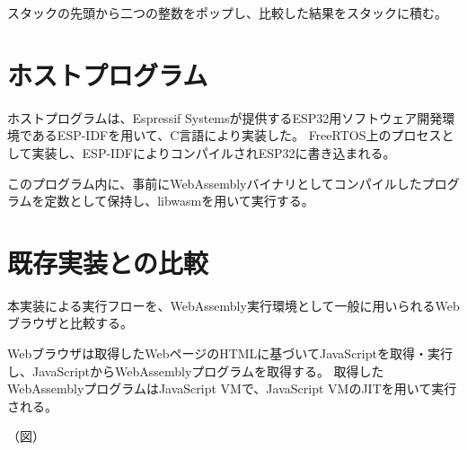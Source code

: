 スタックの先頭から二つの整数をポップし、比較した結果をスタックに積む。

\section{ホストプログラム}

ホストプログラムは、Espressif Systemsが提供するESP32用ソフトウェア開発環境であるESP-IDF\cite{esp_idf}を用いて、C言語により実装した。
FreeRTOS上のプロセスとして実装し、ESP-IDFによりコンパイルされESP32に書き込まれる。

このプログラム内に、事前にWebAssemblyバイナリとしてコンパイルしたプログラムを定数として保持し、libwasmを用いて実行する。

\section{既存実装との比較}

本実装による実行フローを、WebAssembly実行環境として一般に用いられるWebブラウザと比較する。

Webブラウザは取得したWebページのHTMLに基づいてJavaScriptを取得・実行し、JavaScriptからWebAssemblyプログラムを取得する。
取得したWebAssemblyプログラムはJavaScript VMで、JavaScript VMのJITを用いて実行される。

（図）
